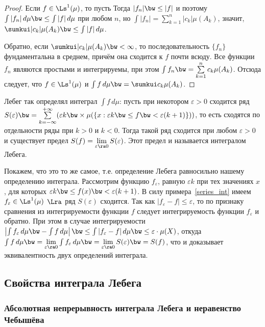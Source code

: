 \documentclass[10pt]{article}
\newcommand{\ve}{\varepsilon}
\begin{document}
\begin{proof}
Если $f\in \Ls^1(\mu)$, то пусть 
Тогда $|f_n|\bw \le|f|$ и поэтому $\int|f_n|\,d\mu\bw
\le\int|f|\,d\mu$ при любом $n$, но
$\int|f_n|=\sum\limits_{k=1}^n|c_k|\mu(A_k)$, значит,
$\sumkui|c_k|\mu(A_k)\bw \le\int|f|\,d\mu$.

Обратно, если $\sumkui|c_k|\mu(A_k)\bw <\infty$, то
последовательность $\{f_n\}$ фундаментальна в среднем, причём она
сходится к $f$ почти всюду. Все функции $f_n$ являются простыми и
интегрируемы, при этом $\int f_n\bw
=\sum\limits_{k=1}^nc_k\mu(A_k)$. Отсюда следует, что $f\in
\Ls^1(\mu)$ и $\int f\,d\mu\bw =\sumkui c_k\mu(A_k)$.
\end{proof}


\begin{note}
Лебег так определял интеграл $\int f\,d\mu$: пусть при некотором
$\ve>0$ сходится ряд $S(\ve)\bw
=\sum\limits_{k=-\infty}^{+\infty}(\ve k\bw \times\mu(\{x:\ve k\bw
\le f\bw <\ve(k+1)\}))$, то есть сходятся по отдельности ряды при
$k>0$ и $k<0$. Тогда такой ряд сходится при любом $\ve>0$ и
существует предел $S(f)=\lim\limits_{\ve\ra0}S(\ve)$. Этот предел и
называется интегралом Лебега.

Покажем, что это то же самое, т.е. определение Лебега равносильно
нашему определению интеграла.  Рассмотрим функцию $f_\ve$, равную
$\ve k$ при тех значениях $x$, для которых $\ve k\bw \le f(x)\bw
<\ve(k+1)$. В силу примера~\ref{series_int} имеем $f_\ve\in
\Ls^1(\mu)$ $\Lra$ ряд $S(\ve)$ сходится. Так как $|f_\ve-f|\le\ve$,
то по признаку сравнения из интегрируемости функции $f$ следует
интегрируемость функции $f_\ve$ и обратно. При этом в случае
интегрируемости $\left|\int f_\ve\,d\mu\bw -\int f\,d\mu\right|\bw
\le\int|f_\ve-f|\,d\mu\bw \le\ve\cdot\mu(X)$, откуда $\int
f\,d\mu\bw =\lim\limits_{\ve\ra0}\int f_\ve\,d\mu\bw
=\lim\limits_{\ve\ra0}S(\ve)\bw =S(f)$, что и доказывает
эквивалентность двух определений интеграла.
\end{note}

\subsection{Свойства интеграла Лебега}
\subsubsection{Абсолютная непрерывность интеграла Лебега и неравенство
Чебышёва}
\end{document}
